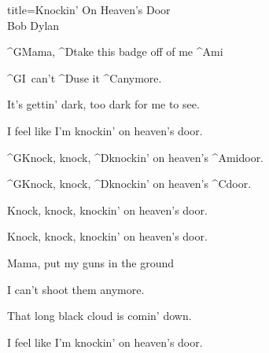 \begin{song}{title=\predtitle\centering Knockin' On Heaven's Door \\\large Bob Dylan  \vspace*{-0.3cm}}  %
\begin{centerjustified}
\nejnejvetsi

\sloka
	^{G}Mama, ^{D}take this badge off of me ^{Ami} 
 
	^{G\z}I~can't ^{D}use it ^{C}anymore. 
 
	It's gettin' dark, too dark for me to see.

	I feel like I'm knockin' on heaven's door.

	^{G}Knock, knock, ^{D}knockin' on heaven's  ^{Ami}door.

	^{G}Knock, knock, ^{D}knockin' on heaven's  ^{C}door. 
 
	Knock, knock, knockin' on heaven's door.

	Knock, knock, knockin' on heaven's door.

\sloka
	Mama, put my guns in the ground 

	I can't shoot them anymore. 

	That long black cloud is comin' down. 

	I feel like I'm knockin' on heaven's door. 


\end{centerjustified}

\centering
{}

\setcounter{Slokočet}{0}
\end{song}
